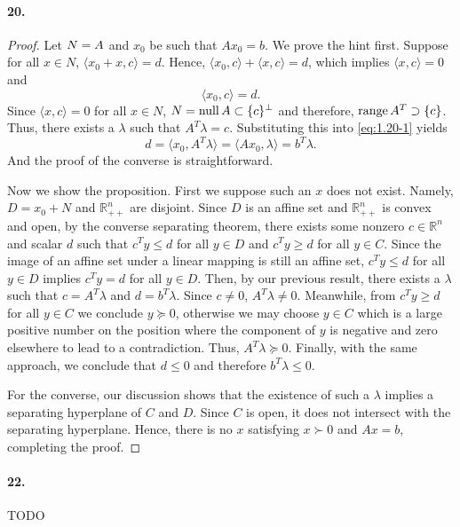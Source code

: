   \paragraph{20.}
  \begin{proof}
    Let $N=\null A$ and $x_0$ be such that $Ax_0=b$. We prove the hint first.
    Suppose for all $x\in N$, $\langle x_0+x,c\rangle=d$. Hence, $\langle x_0,
    c\rangle+\langle x,c\rangle=d$, which implies $\langle x,c\rangle=0$ and
    \begin{equation}
      \label{eq:1.20-1}
      \langle x_0, c\rangle=d.
    \end{equation}
    Since $\langle x,c\rangle=0$ for all $x\in N$, $N=\operatorname{null} A\subset\{c\}^\perp$
    and therefore, $\operatorname{range} A^T\supset\{c\}$. Thus, there exists a $\lambda$ such
    that $A^T\lambda=c$. Substituting this into \eqref{eq:1.20-1} yields
    \[
      d=\langle x_0,A^T\lambda\rangle=\langle Ax_0,\lambda\rangle=b^T\lambda.
    \]
    And the proof of the converse is straightforward.\par
    Now we show the proposition. First we suppose such an $x$ does not exist.
    Namely, $D=x_0+N$ and $\mathbb{R}^n_{++}$ are disjoint. Since $D$ is an 
    affine set and $\mathbb{R}^n_{++}$ is convex and open, by the converse 
    separating theorem, there exists some nonzero $c\in\mathbb{R}^n$ and scalar 
    $d$ such that $c^Ty\le d$ for all $y\in D$ and $c^Ty\ge d$ for all $y\in C$. 
    Since the image of an affine set under a linear mapping is still an affine 
    set, $c^Ty\le d$ for all $y\in D$ implies $c^Ty=d$ for all $y\in D$. Then, 
    by our previous result, there exists a $\lambda$ such that $c=A^T\lambda$ 
    and $d=b^T\lambda$. Since $c\ne 0$, $A^T\lambda\ne 0$. Meanwhile, from $c^T
    y\ge d$ for all $y\in C$ we conclude $y\succeq 0$, otherwise we may choose 
    $y\in C$ which is a large positive number on the position where the
    component of $y$ is negative and zero elsewhere to lead to a contradiction.
    Thus, $A^T\lambda\succeq 0$. Finally, with the same approach, we conclude
    that $d\le 0$ and therefore $b^T\lambda\le 0$.\par
    For the converse, our discussion shows that the existence of such a 
    $\lambda$ implies a separating hyperplane of $C$ and $D$. Since $C$ is open,
    it does not intersect with the separating hyperplane. Hence, there is no $x$ 
    satisfying $x\succ 0$ and $Ax=b$, completing the proof.
  \end{proof}
  
  \paragraph{22.} TODO
  
